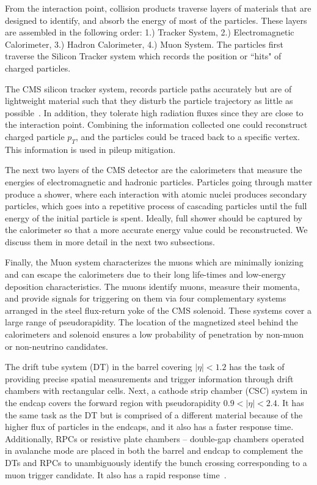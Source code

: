 From the interaction point, collision products traverse layers of materials that are designed to identify, and absorb the energy of most of the particles. These layers are assembled in the following order: 1.) Tracker System, 2.) Electromagnetic Calorimeter, 3.) Hadron Calorimeter, 4.) Muon System. The particles first traverse the Silicon Tracker system which records the position or ``hits" of charged particles. 


The CMS silicon tracker system, records particle paths accurately but are of lightweight material such that they disturb the particle trajectory as little as possible~\cite{CMS:2008xjf}. In addition, they tolerate high radiation fluxes since they are close to the interaction point. Combining the information collected one could reconstruct charged particle $p_T$, and the particles could be traced back to a specific vertex. This information is used in pileup mitigation. 

The next two layers of the CMS detector are the calorimeters that measure the energies of electromagnetic and hadronic particles. Particles going through matter produce a shower, where each interaction with atomic nuclei produces secondary particles, which goes into a repetitive process of cascading particles until the full energy of the initial particle is spent. Ideally, full shower should be captured by the calorimeter so that a more accurate energy value could be reconstructed. We discuss them in more detail in the next two subsections.

Finally, the Muon system characterizes the muons which are minimally ionizing and can escape the calorimeters due to their long life-times and low-energy deposition characteristics. The muons identify muons, measure their momenta, and provide signals for triggering on them via four complementary systems arranged in the steel flux-return yoke of the CMS solenoid. These systems cover a large range of pseudorapidity. The location of the magnetized steel behind the calorimeters and solenoid ensures a low probability of penetration by non-muon or non-neutrino candidates. 

The drift tube system (DT) in the barrel covering $|\eta| < 1.2$ has the task of providing precise spatial measurements and trigger information through drift chambers with rectangular cells. Next, a cathode strip chamber (CSC) system in the endcap covers the forward region with pseudorapidity $0.9 < |\eta| < 2.4$. It has the same task as the DT but is comprised of a different material because of the higher flux of particles in the endcaps, and it also has a faster response time. Additionally, RPCs or resistive plate chambers -- double-gap chambers operated in avalanche mode are placed in both the barrel and endcap to complement the DTs and RPCs to unambiguously identify the bunch crossing corresponding to a muon trigger candidate. It also has a rapid response time~\cite{CMS:2023gfb}.

